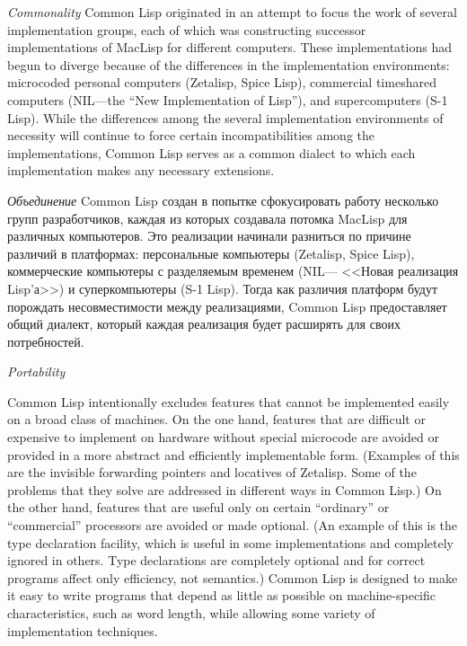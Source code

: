 \begin{flushdesc}
\item[{\it Commonality}]
Common Lisp originated in an attempt to focus the
work of several implementation groups, each of which was constructing successor
implementations of MacLisp for different computers.  These
implementations had begun to diverge because of the differences in the
implementation environments: microcoded personal computers (Zetalisp,
Spice Lisp), commercial timeshared computers (NIL---the ``New Implementation of
Lisp''), and supercomputers (S-1 Lisp).  While the differences among the several
implementation environments of necessity will continue to force
certain incompatibilities among the
implementations, Common Lisp serves as a common dialect to
which each implementation makes any necessary extensions.

\item[{\it Объединение}]
Common Lisp создан в попытке сфокусировать работу несколько групп
разработчиков, каждая из которых создавала потомка MacLisp для
различных компьютеров. Это реализации начинали разниться по
причине различий в платформах: персональные компьютеры (Zetalisp,
Spice Lisp), коммерческие компьютеры с разделяемым временем
(NIL--- <<Новая реализация Lisp'а>>) и суперкомпьютеры (S-1
Lisp). Тогда как различия платформ будут порождать несовместимости
между реализациями, Common Lisp предоставляет общий диалект,
который каждая реализация будет расширять для своих потребностей.

\item[{\it Portability}]

\begingroup{}
Common Lisp intentionally excludes features
that cannot be implemented easily on a broad class of machines.
On the one hand, features that are difficult or expensive
to implement on hardware without special microcode are avoided
or provided in a more abstract and efficiently implementable form.
(Examples of this are the invisible forwarding pointers
and locatives of Zetalisp.  Some of the problems that they solve
are addressed in different ways in Common Lisp.)
On the other hand, features that are useful only on certain ``ordinary''
or ``commercial'' processors are avoided or made optional.  (An example of
this is the type declaration facility, which is useful in some
implementations and completely ignored in others.  Type declarations are
completely optional and for correct programs
affect only efficiency, not semantics.)
Common Lisp is designed to make it easy to write programs
that depend as little as possible on machine-specific
characteristics, such as word length, while allowing some variety of
implementation \hbox{techniques}.
\par\endgroup


\end{flushdesc}

